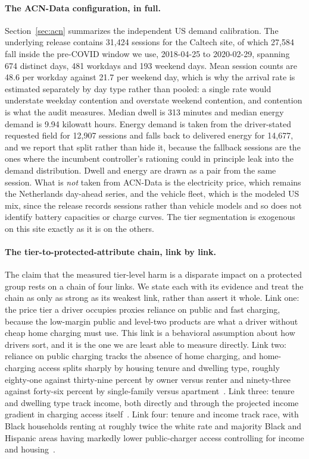 \documentclass[manuscript, screen, review, anonymous]{acmart}
\begin{document}
\paragraph{The ACN-Data configuration, in full.}
\label{app:acn}
Section~\ref{sec:acn} summarizes the independent US demand calibration. The underlying release contains 31{,}424 sessions for the Caltech site, of which 27{,}584 fall inside the pre-COVID window we use, 2018-04-25 to 2020-02-29, spanning 674 distinct days, 481 workdays and 193 weekend days. Mean session counts are 48.6 per workday against 21.7 per weekend day, which is why the arrival rate is estimated separately by day type rather than pooled: a single rate would understate weekday contention and overstate weekend contention, and contention is what the audit measures. Median dwell is 313 minutes and median energy demand is 9.94 kilowatt hours. Energy demand is taken from the driver-stated requested field for 12{,}907 sessions and falls back to delivered energy for 14{,}677, and we report that split rather than hide it, because the fallback sessions are the ones where the incumbent controller's rationing could in principle leak into the demand distribution. Dwell and energy are drawn as a pair from the same session. What is \emph{not} taken from ACN-Data is the electricity price, which remains the Netherlands day-ahead series, and the vehicle fleet, which is the modeled US mix, since the release records sessions rather than vehicle models and so does not identify battery capacities or charge curves. The tier segmentation is exogenous on this site exactly as it is on the others.

\paragraph{The tier-to-protected-attribute chain, link by link.}
The claim that the measured tier-level harm is a disparate impact on a protected group rests on a chain of four links. We state each with its evidence and treat the chain as only as strong as its weakest link, rather than assert it whole. Link one: the price tier a driver occupies proxies reliance on public and fast charging, because the low-margin public and level-two products are what a driver without cheap home charging must use. This link is a behavioral assumption about how drivers sort, and it is the one we are least able to measure directly. Link two: reliance on public charging tracks the absence of home charging, and home-charging access splits sharply by housing tenure and dwelling type, roughly eighty-one against thirty-nine percent by owner versus renter and ninety-three against forty-six percent by single-family versus apartment~\cite{doeeere2018,bauer2021charging}. Link three: tenure and dwelling type track income, both directly and through the projected income gradient in charging access itself~\cite{bauer2021charging,drehobl2020high}. Link four: tenure and income track race, with Black households renting at roughly twice the white rate and majority Black and Hispanic areas having markedly lower public-charger access controlling for income and housing~\cite{lou2024income,hsu2021public,yu2025equity}.
\end{document}
